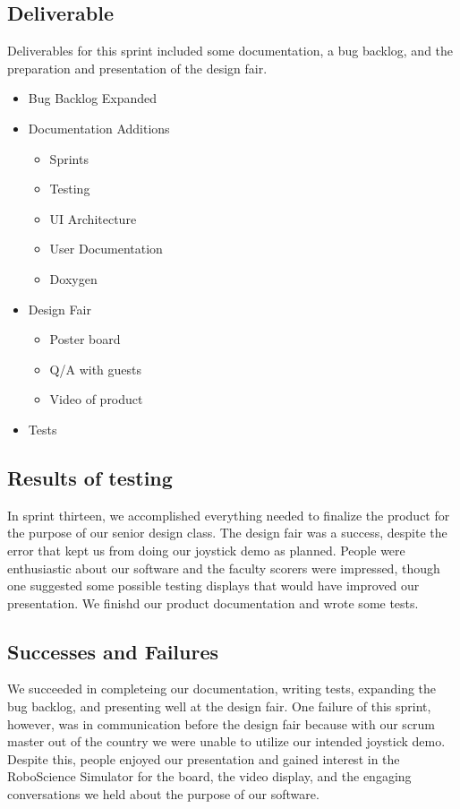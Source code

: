\subsection{Deliverable}

Deliverables for this sprint included some documentation, a bug backlog, and the preparation and presentation of the design fair. 

\begin{itemize}
	\item Bug Backlog Expanded
	\item Documentation	Additions	
	\begin{itemize}
		\item Sprints
		\item Testing
		\item UI Architecture
		\item User Documentation
		\item Doxygen
	\end{itemize}
	\item Design Fair	
	\begin{itemize}
    	\item Poster board
    	\item Q/A with guests
    	\item Video of product
	\end{itemize}
	\item Tests
\end{itemize}

\subsection{Results of testing}
In sprint thirteen, we accomplished everything needed to finalize the product for the purpose of our senior design class. The design fair was a success, despite the error that kept us from doing our joystick demo as planned. People were enthusiastic about our software and the faculty scorers were impressed, though one suggested some possible testing displays that would have improved our presentation. We finishd our product documentation and wrote some tests.

\subsection{Successes and Failures}
We succeeded in completeing our documentation, writing tests, expanding the bug backlog, and presenting well at the design fair. One failure of this sprint, however, was in communication before the design fair because with our scrum master out of the country we were unable to utilize our intended joystick demo. Despite this, people enjoyed our presentation and gained interest in the RoboScience Simulator for the board, the video display, and the engaging conversations we held about the purpose of our software.

